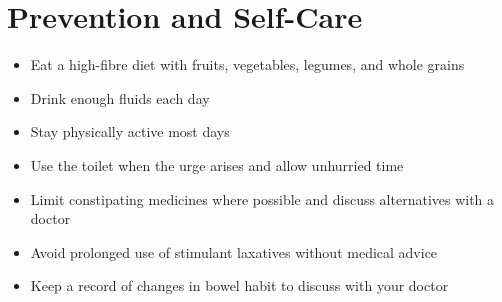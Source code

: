 \section*{Prevention and Self-Care}
\begin{itemize}
    \item Eat a high-fibre diet with fruits, vegetables, legumes, and whole grains
    \item Drink enough fluids each day
    \item Stay physically active most days
    \item Use the toilet when the urge arises and allow unhurried time
    \item Limit constipating medicines where possible and discuss alternatives with a doctor
    \item Avoid prolonged use of stimulant laxatives without medical advice
    \item Keep a record of changes in bowel habit to discuss with your doctor
\end{itemize}
